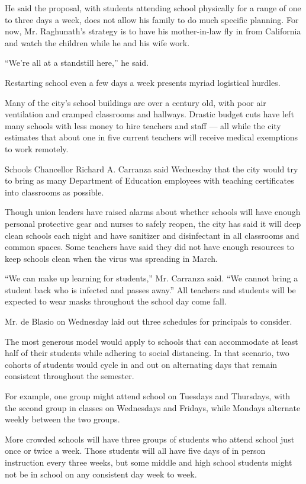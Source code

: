 He said the proposal, with students attending school physically for a
range of one to three days a week, does not allow his family to do much
specific planning. For now, Mr. Raghunath's strategy is to have his
mother-in-law fly in from California and watch the children while he and
his wife work.

``We're all at a standstill here,'' he said.

Restarting school even a few days a week presents myriad logistical
hurdles.

Many of the city's school buildings are over a century old, with poor
air ventilation and cramped classrooms and hallways. Drastic budget cuts
have left many schools with less money to hire teachers and staff ---
all while the city estimates that about one in five current teachers
will receive medical exemptions to work remotely.

Schools Chancellor Richard A. Carranza said Wednesday that the city
would try to bring as many Department of Education employees with
teaching certificates into classrooms as possible.

Though union leaders have raised alarms about whether schools will have
enough personal protective gear and nurses to safely reopen, the city
has said it will deep clean schools each night and have sanitizer and
disinfectant in all classrooms and common spaces. Some teachers have
said they did not have enough resources to keep schools clean when the
virus was spreading in March.

``We can make up learning for students,'' Mr. Carranza said. ``We cannot
bring a student back who is infected and passes away.'' All teachers and
students will be expected to wear masks throughout the school day come
fall.

Mr. de Blasio on Wednesday laid out three schedules for principals to
consider.

The most generous model would apply to schools that can accommodate at
least half of their students while adhering to social distancing. In
that scenario, two cohorts of students would cycle in and out on
alternating days that remain consistent throughout the semester.

For example, one group might attend school on Tuesdays and Thursdays,
with the second group in classes on Wednesdays and Fridays, while
Mondays alternate weekly between the two groups.

More crowded schools will have three groups of students who attend
school just once or twice a week. Those students will all have five days
of in person instruction every three weeks, but some middle and high
school students might not be in school on any consistent day week to
week.

